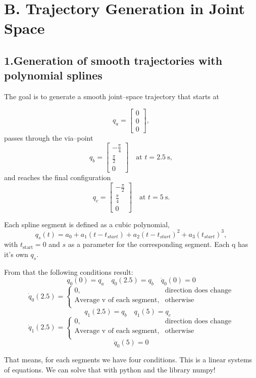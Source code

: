 \documentclass[a4paper,12pt]{article}
\begin{document}
\section*{B. Trajectory Generation in Joint Space}
\subsection*{1.Generation of smooth trajectories with polynomial splines}
The goal is to generate a smooth joint–space trajectory that starts at


\[
q_a = \begin{bmatrix}0 \\ 0 \\ 0\end{bmatrix},
\]
passes through the via–point
\[
q_b = \begin{bmatrix}-\frac{\pi}{4} \\[2pt] \frac{\pi}{2} \\ 0\end{bmatrix}
\quad \text{at } t=2.5\ \text{s},
\]
and reaches the final configuration
\[
q_c = \begin{bmatrix}-\frac{\pi}{2} \\[2pt] \frac{\pi}{4} \\ 0\end{bmatrix}
\quad \text{at } t=5\ \text{s}.
\]

Each spline segment is defined as a cubic polynomial,
\[
q_{s}(t)=a_0 + a_1 (t-t_{start}) + a_2 (t- t_{start})^2 + a_3 (t_{start})^3,
\]
with $t_{\text{start}} = 0$ and $s$ as a parameter for the corresponding segment. Each q has it's own $q_{s}$.

From that the following conditions result:
\[
    q_0(0) = q_a \quad
    q_0(2.5)= q_b\quad
    \dot q_0(0) = 0 
\]
\[
    \dot q_0(2.5) =
\begin{cases}
\text{0}, & \text{direction does change} \\
\text{Average v of each segment}, & \text{otherwise} \\
\end{cases}
\]
\[
    q_1(2.5) = q_b\quad
    q_1(5) = q_c \quad
\]
\[
    \dot q_1(2.5) =
\begin{cases}
\text{0}, & \text{direction does change} \\
\text{Average v of each segment}, & \text{otherwise} \\
\end{cases}
\]
\[
    \dot q_0(5) = 0 
\]

That means, for each segments we have four conditions. This is a linear systems of equations. We can solve that with python and the library numpy!
\end{document}

